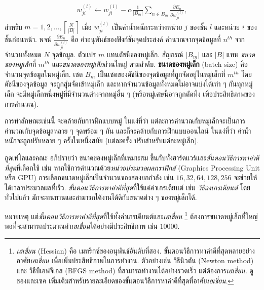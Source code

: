 \begin{eqnarray}
w^{(l)}_{ji} \leftarrow w^{(l)}_{ji} - \alpha \frac{1}{|B_m|} \sum_{n \in B_m} \frac{\partial E_n}{\partial w^{(l)}_{ji}}, 
\label{eq: deep minibatch}
\end{eqnarray}
สำหรับ $m = 1, 2, \ldots, \left\lceil\frac{N}{|B|}\right\rceil$ 
เมื่อ 
$w^{(l)}_{ji}$ เป็นค่าน้ำหนักระหว่างหน่วย $j$ ของชั้น $l$ และหน่วย $i$  ของชั้นก่อนหน้า.
พจน์ $\frac{\partial E_n}{\partial w^{(l)}_{ji}}$ คือ ค่าอนุพันธ์ของฟังก์ชันจุดประสงค์ คำนวณจากจุดข้อมูลที่ $n^{th}$ จากจำนวนทั้งหมด $N$ จุดข้อมูล.
ตัวแปร $m$ แทนดัชนีของหมู่เล็ก.
สัญกรณ์ $|B_m|$ และ $|B|$ แทน \textit{ขนาดของหมู่เล็ก}ที่ $m^{th}$ และ\textit{ขนาดของหมู่เล็ก}ส่วนใหญ่ ตามลำดับ.
\textbf{ขนาดของหมู่เล็ก} (batch size) คือ จำนวนจุดข้อมูลในหมู่เล็ก.
เซต $B_m$ เป็นเซตของดัชนีของจุดข้อมูลที่ถูกจัดอยู่ในหมู่เล็กที่ $m^{th}$
โดยดัชนีของจุดข้อมูล จะถูกสุุ่มจัดเข้าหมู่เล็ก 
และหากจำนวนข้อมูลทั้งหมดไม่อาจแบ่งได้เท่า ๆ กันทุกหมู่เล็ก
จะมีหมู่เล็กหนึ่งหมู่ที่มีจำนวนต่างจากหมู่อื่น ๆ (หรือหมู่เศษนี้อาจถูกตัดทิ้ง เพื่อประสิทธิภาพของการคำนวณ).

การทำลักษณะเช่นนี้ จะคล้ายกับการฝึกแบบหมู่ ในแง่ที่ว่า แต่ละการคำนวณกับหมู่เล็กจะเป็นการคำนวณกับจุดข้อมูลหลาย ๆ จุดพร้อม ๆ กัน 
และก็จะคล้ายกับการฝึกแบบออนไลน์ ในแง่ที่ว่า ค่าน้ำหนักจะถูกปรับหลาย ๆ ครั้งในหนึ่งสมัย (แต่ละครั้ง ปรับสำหรับแต่ละหมู่เล็ก).
%

กูดเฟโลและคณะ\cite{GoodfellowEtAl2016}
อภิปรายว่า 
ขนาดของหมู่เล็กที่เหมาะสม ขึ้นกับทั้งฮาร์ดแวร์และ\textit{ขั้นตอนวิธีการหาค่าดีที่สุด}ที่เลือกใช้
เช่น หากใช้การคำนวณด้วย\textit{หน่วยประมวลผลกราฟิกส์} (Graphics Processing Unit หรือ GPU)
การเลือกขนาดหมู่เล็กเป็นจำนวนของสองยกกำลัง เช่น $16, 32, 64, 128, 256$ จะช่วยให้ได้เวลาประมวลผลที่เร็ว.
\textit{ขั้นตอนวิธีการหาค่าดีที่สุด}ที่ใช้แค่ค่าเกรเดียนต์  เช่น \textit{วิธีลงเกรเดียนต์} 
โดยทั่วไปแล้ว มักจะทนทานและสามารถได้งานได้ดีกับขนาดต่าง ๆ ของหมู่เล็กได้.

หมายเหตุ แต่\textit{ขั้นตอนวิธีการหาค่าดีที่สุด}ที่ใช้ทั้งค่าเกรเดียนต์และ\textit{เฮเชี่ยน}%
\footnote{%
\textit{เฮเชี่ยน} (Hessian) คือ เมทริกซ์ของอนุพันธ์อันดับที่สอง.
ขั้นตอนวิธีการหาค่าดีที่สุดหลายอย่าง อาศัย\textit{เฮเชี่ยน} เพื่อเพิ่มประสิทธิภาพในการทำงาน.
ตัวอย่างเช่น วิธีนิวตัน (Newton method) และ วิธีบีเอฟจีเอส (BFGS method)
ที่สามารถทำงานได้อย่างรวดเร็ว แต่ต้องการ\textit{เฮเชี่ยน}.
ดู ชองและเซค\cite{ChongZak2ndEd} เพิ่มเติมสำหรับรายละเอียดของขั้นตอนวิธีการหาค่าดีที่สุดที่อาศัย\textit{เฮเชี่ยน}.
}
ต้องการขนาดหมู่เล็กที่ใหญ่พอที่จะสามารถประมาณค่า\textit{เฮเชี่ยน}ได้อย่างมีประสิทธิภาพ เช่น\cite{GoodfellowEtAl2016} $10000$.

